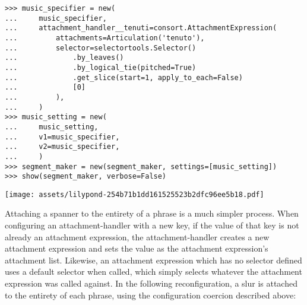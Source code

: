 \begin{comment}
<abjad>[stylesheet=../consort.ily]
music_specifier = new(
    music_specifier,
    attachment_handler__tenuti=consort.AttachmentExpression(
        attachments=Articulation('tenuto'),
        selector=selectortools.Selector()
            .by_leaves()
            .by_logical_tie(pitched=True)
            .get_slice(start=1, apply_to_each=False)
            [0]
        ),
    )
music_setting = new(
    music_setting,
    v1=music_specifier,
    v2=music_specifier,
    )
segment_maker = new(segment_maker, settings=[music_setting])
show(segment_maker, verbose=False)
</abjad>
\end{comment}

\begin{abjadbookoutput}
\begin{singlespacing}
\vspace{-0.5\baselineskip}
\begin{lstlisting}
>>> music_specifier = new(
...     music_specifier,
...     attachment_handler__tenuti=consort.AttachmentExpression(
...         attachments=Articulation('tenuto'),
...         selector=selectortools.Selector()
...             .by_leaves()
...             .by_logical_tie(pitched=True)
...             .get_slice(start=1, apply_to_each=False)
...             [0]
...         ),
...     )
>>> music_setting = new(
...     music_setting,
...     v1=music_specifier,
...     v2=music_specifier,
...     )
>>> segment_maker = new(segment_maker, settings=[music_setting])
>>> show(segment_maker, verbose=False)
\end{lstlisting}
\noindent\texttt{[image: assets/lilypond-254b71b1dd161525523b2dfc96ee5b18.pdf]}
\end{singlespacing}
\end{abjadbookoutput}

\noindent Attaching a spanner to the entirety of a phrase is a much simpler
process. When configuring an attachment-handler with a new key, if the value of
that key is not already an attachment expression, the attachment-handler
creates a new attachment expression and sets the value as the attachment
expression's attachment list. Likewise, an attachment expression which has no
selector defined uses a default selector when called, which simply selects
whatever the attachment expression was called against. In the following
reconfiguration, a slur is attached to the entirety of each phrase, using the
configuration coercion described above:

\begin{comment}
<abjad>[stylesheet=../consort.ily]
music_specifier = new(
    music_specifier,
    attachment_handler__slurs=Slur()
    )
music_setting = new(
    music_setting,
    v1=music_specifier,
    v2=music_specifier,
    )
segment_maker = new(segment_maker, settings=[music_setting])
show(segment_maker, verbose=False)
</abjad>
\end{comment}


